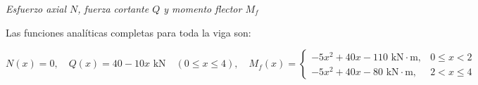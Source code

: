 


\vspace{1em}


\begin{center}

    \textit{\small Esfuerzo axial $N$, fuerza cortante $Q$ y momento flector $M_f$}

\end{center}



Las funciones analíticas completas para toda la viga son:

\begin{equation}

    N(x) = 0, \quad

    Q(x) = 40 - 10x\text{ kN} \quad (0 \le x \le 4), \quad

    M_f(x) = \begin{cases}

        -5x^2 + 40x - 110\text{ kN}\cdot\text{m}, & 0 \le x < 2 \\

        -5x^2 + 40x - 80\text{ kN}\cdot\text{m},  & 2 < x \le 4

    \end{cases}

\end{equation}




